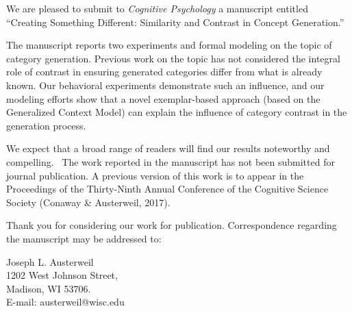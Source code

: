 \documentclass[12pt]{article}
\begin{document}
We are pleased to submit to {\em Cognitive Psychology} a manuscript entitled ``Creating Something Different: Similarity and Contrast in Concept Generation.''

The manuscript reports two experiments and formal modeling on the topic of category generation. Previous work on the topic has not considered the integral role of contrast in ensuring generated categories differ from what is already known. Our behavioral experiments demonstrate such an influence, and our modeling efforts show that a novel exemplar-based approach (based on the Generalized Context Model) can explain the influence of category contrast in the generation process. 

We expect that a broad range of readers will find our results noteworthy and compelling.  The work reported in the manuscript has not been submitted for journal publication. A previous version of this work is to appear in the Proceedings of the Thirty-Ninth Annual Conference of the Cognitive Science Society (Conaway \& Austerweil, 2017).

Thank you for considering our work for publication. Correspondence regarding the manuscript may be addressed to:

Joseph L. Austerweil \\
1202 West Johnson Street,\\ 
Madison, WI 53706.\\
E-mail: austerweil@wisc.edu
\end{document}
